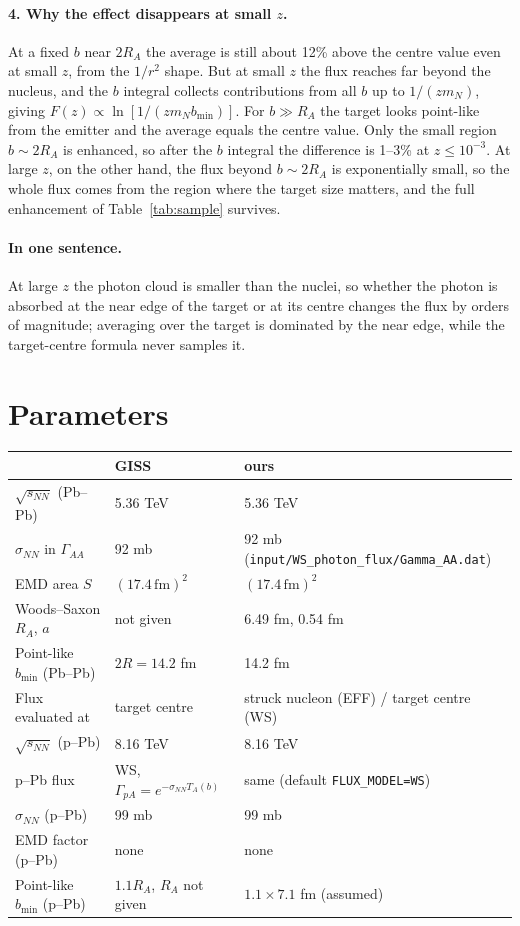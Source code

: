 \documentclass[11pt]{article}
\begin{document}
\paragraph{4. Why the effect disappears at small $z$.} At a fixed $b$ near $2R_A$ the average is
still about 12\% above the centre value even at small $z$, from the $1/r^2$ shape. But at small $z$
the flux reaches far beyond the nucleus, and the $b$ integral collects contributions from all
$b$ up to $1/(zm_N)$, giving $F(z)\propto\ln[1/(zm_Nb_{\min})]$. For $b\gg R_A$ the target looks
point-like from the emitter and the average equals the centre value. Only the small region
$b\sim 2R_A$ is enhanced, so after the $b$ integral the difference is 1--3\% at $z\le 10^{-3}$. At
large $z$, on the other hand, the flux beyond $b\sim 2R_A$ is exponentially small, so the whole
flux comes from the region where the target size matters, and the full enhancement of
Table~\ref{tab:sample} survives.

\paragraph{In one sentence.} At large $z$ the photon cloud is smaller than the nuclei, so whether
the photon is absorbed at the near edge of the target or at its centre changes the flux by
orders of magnitude; averaging over the target is dominated by the near edge, while the
target-centre formula never samples it.

\section{Parameters}

\begin{center}
\begin{tabular}{lll}
\toprule
 & GISS & ours \\
\midrule
$\sqrt{s_{NN}}$ (Pb--Pb) & 5.36 TeV & 5.36 TeV \\
$\sigma_{NN}$ in $\Gamma_{AA}$ & 92 mb & 92 mb (\texttt{input/WS\_photon\_flux/Gamma\_AA.dat}) \\
EMD area $S$ & $(17.4\,\text{fm})^2$ & $(17.4\,\text{fm})^2$ \\
Woods--Saxon $R_A$, $a$ & not given & 6.49 fm, 0.54 fm \\
Point-like $b_{\min}$ (Pb--Pb) & $2R=14.2$ fm & 14.2 fm \\
Flux evaluated at & target centre & struck nucleon (EFF) / target centre (WS) \\
\midrule
$\sqrt{s_{NN}}$ (p--Pb) & 8.16 TeV & 8.16 TeV \\
p--Pb flux & WS, $\Gamma_{pA}=e^{-\sigma_{NN}T_A(b)}$ & same (default \texttt{FLUX\_MODEL=WS}) \\
$\sigma_{NN}$ (p--Pb) & 99 mb & 99 mb \\
EMD factor (p--Pb) & none & none \\
Point-like $b_{\min}$ (p--Pb) & $1.1R_A$, $R_A$ not given & $1.1\times 7.1$ fm (assumed) \\
\bottomrule
\end{tabular}
\end{center}
\end{document}
